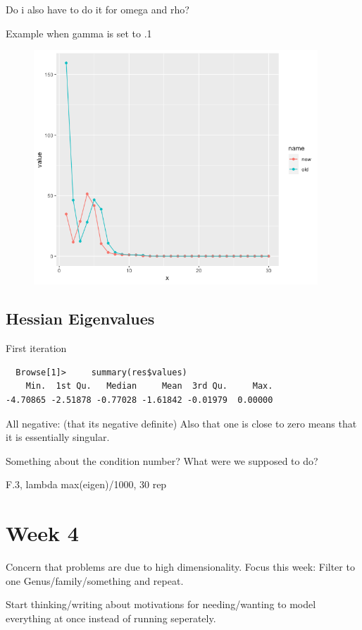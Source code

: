 \documentclass[10pt]{article}
\theoremstyle{definition}
\begin{document}
Do i also have to do it for omega and rho?

Example when gamma is set to .1

\begin{figure}[!htb]
	\centering
	\includegraphics[width=0.95\textwidth]{img/Spring_2022_Journal-468b961e.png}
	\caption{}
	\label{}
\end{figure}




\subsection{Hessian Eigenvalues}

First iteration
\begin{verbatim}
  Browse[1]>     summary(res$values)
    Min.  1st Qu.   Median     Mean  3rd Qu.     Max.
-4.70865 -2.51878 -0.77028 -1.61842 -0.01979  0.00000
\end{verbatim}

All negative: (that its negative definite) Also that one is close to zero means that it is essentially singular.


Something about the condition number? What were we supposed to do?

F.3, lambda max(eigen)/1000, 30 rep


\section{Week 4}

Concern that problems are due to high dimensionality. Focus this week: Filter to one Genus/family/something and repeat.

Start thinking/writing about motivations for needing/wanting to model everything at once instead of running seperately.
\end{document}
